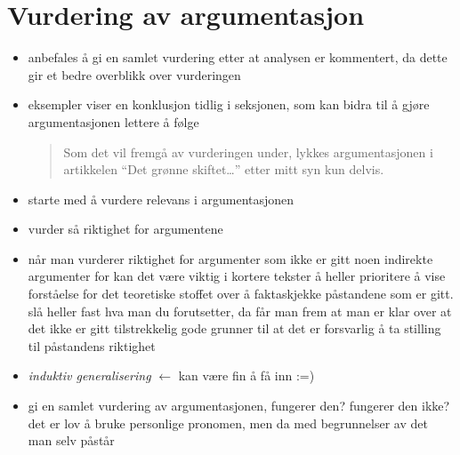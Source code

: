 \documentclass[a4paper,11pt,norsk]{article}
\begin{document}
\section*{Vurdering av argumentasjon}
\begin{itemize}
    \item anbefales å gi en samlet vurdering etter at analysen er kommentert, da dette gir et bedre overblikk over vurderingen
    \item eksempler viser en konklusjon tidlig i seksjonen, som kan bidra til å gjøre argumentasjonen lettere å følge
        \begin{quote}
            Som det vil fremgå av vurderingen under,  lykkes argumentasjonen i artikkelen “Det grønne skiftet…” etter mitt syn kun delvis.
        \end{quote}
    \item starte med å vurdere relevans i argumentasjonen
    \item vurder så riktighet for argumentene

    \item når man vurderer riktighet for argumenter som ikke er gitt noen indirekte argumenter for 
        kan det være viktig i kortere tekster å heller prioritere å vise forståelse for det teoretiske stoffet over å 
        faktaskjekke påstandene som er gitt. slå heller fast hva man du forutsetter, da får man frem at man er klar over at det 
        ikke er gitt tilstrekkelig gode grunner til at det er forsvarlig å ta stilling til påstandens riktighet
    \item \textit{induktiv generalisering} $\leftarrow$ kan være fin å få inn :=)

    \item gi en samlet vurdering av argumentasjonen, fungerer den? fungerer den ikke? det er lov å 
        bruke personlige pronomen, men da med begrunnelser av det man selv påstår
\end{itemize}


\end{document}

